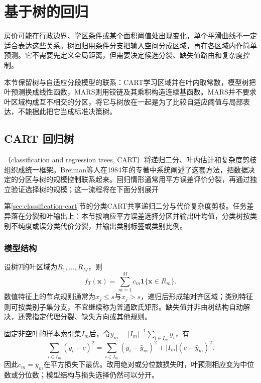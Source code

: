 \section{基于树的回归}
\label{sec:regression-trees}

房价可能在行政边界、学区条件或某个面积阈值处出现变化，单个平滑曲线不一定适合表达这些关系。树回归用条件分支把输入空间分成区域，再在各区域内作简单预测。它不需要先定义全局距离，但需要决定候选分裂、缺失值路由和复杂度控制。

本节保留树与自适应分段模型的联系：CART学习区域并在叶内取常数，模型树把叶预测换成线性函数，MARS则用铰链及其乘积构造连续基函数。MARS并不要求叶区域构成互不相交的分区，将它与树放在一起是为了比较自适应阈值与局部表达，不能据此把它当成标准决策树。

\subsection{CART 回归树}
\label{sec:regression-cart}

（classification and regression trees, CART）将递归二分、叶内估计和复杂度剪枝组织成统一框架。Breiman等人在1984年的专著中系统阐述了这套方法，把数据决定的分区与树的规模控制联系起来。回归情形通常用平方误差评价分裂，再通过独立验证选择树的规模；这一流程将在下面分别展开

第\ref{sec:classification-cart}节的分类CART共享递归二分与代价复杂度剪枝。任务差异落在分裂和叶输出上：本节按响应平方误差选择分区并输出叶均值，分类树按类别不纯度或误分类代价分裂，并输出类别标签或类别比例。

\subsubsection{模型结构}

设树$T$的叶区域为$R_1,\ldots,R_M$，则
\begin{equation}
  f_T(\bm{x})=\sum_{m=1}^{M}c_m\mathbf{1}\{\bm{x}\in R_m\}.
  \label{eq:regression-cart-model}
\end{equation}
数值特征上的节点规则通常为$x_j\leq s$与$x_j>s$，递归后形成轴对齐区域；类别特征则可按类别子集分支，不宜继续称为普通欧氏矩形。缺失值并非由树结构自动解决，还需指定代理分裂、缺失方向或其他规则。

固定非空叶的样本索引集$I_m$后，令$\bar y_m=|I_m|^{-1}\sum_{i\in I_m}y_i$，有
\[
  \sum_{i\in I_m}(y_i-c)^2
  =\sum_{i\in I_m}(y_i-\bar y_m)^2+|I_m|(c-\bar y_m)^2.
\]
因此$c_m=\bar y_m$在平方损失下最优。改用绝对或分位数损失时，叶预测相应变为中位数或分位数；模型结构与损失选择仍然可以分开。

